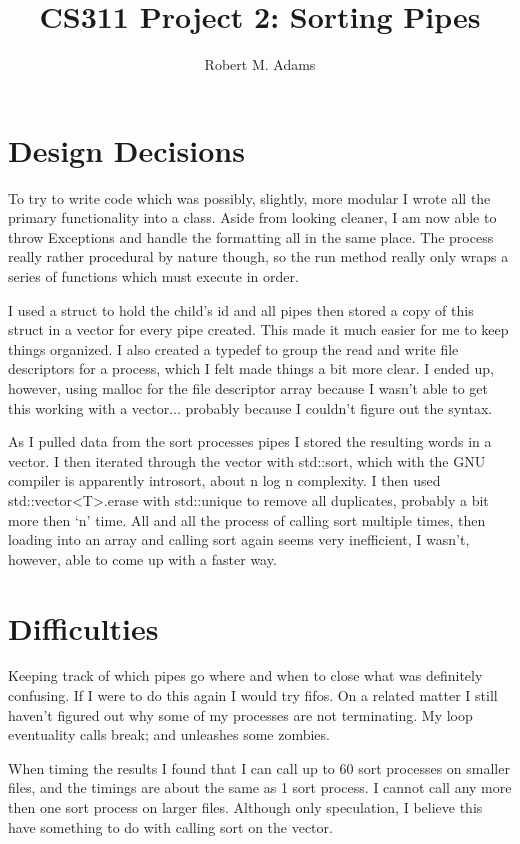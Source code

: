 \documentclass[letterpaper,10pt]{article} %
\begin{document}
  \title{CS311 Project 2: Sorting Pipes}
  \author{Robert M. Adams}
  \maketitle


\section{Design Decisions}


    To try to write code which was possibly, slightly, more modular I wrote all the primary functionality into a class. Aside from looking cleaner, I am now able to throw Exceptions and handle the formatting all in the same place. The process really rather procedural by nature though, so the run method really only wraps a series of functions which must execute in order.


    I used a struct to hold the child’s id and all pipes then stored a copy of this struct in a vector for every pipe created. This made it much easier for me to keep things organized.  I also created a typedef to group the read and write file descriptors for a process, which I felt made things a bit more clear. I ended up, however, using malloc for the file descriptor array because I wasn’t able to get this working with a vector... probably because I couldn't figure out the syntax.


    As I pulled data from the sort processes pipes I stored the resulting words in a vector. I then iterated through the vector with std::sort, which with the GNU compiler is apparently introsort, about n log n complexity. I then used std::vector<T>.erase with std::unique to remove all duplicates, probably a bit more then ‘n’ time. All and all the process of calling sort multiple times, then loading into an array and calling sort again seems very inefficient, I wasn’t, however, able to come up with a faster way.

\section{Difficulties}


    Keeping track of which pipes go where and when to close what was definitely confusing. If I were to do this again I would try fifos. On a related matter I still haven't figured out why some of my processes are not terminating.  My loop eventuality calls break; and unleashes some zombies.


    When timing the results I found that I can call up to 60 sort processes on smaller files, and the timings are about the same as 1 sort process. I cannot call any more then one sort process on larger files. Although only speculation, I believe this have something  to do with calling sort on the vector. 
\end{document}
